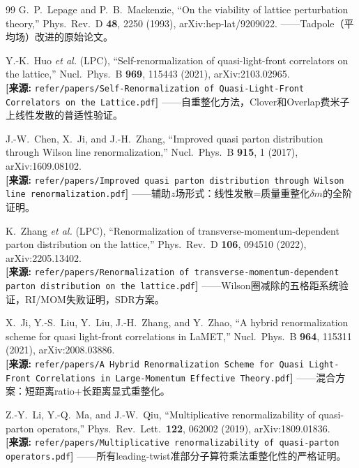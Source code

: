 \documentclass[12pt,a4paper]{ctexart}
\theoremstyle{definition}
\begin{document}
\begin{thebibliography}{99}
G.~P.~Lepage and P.~B.~Mackenzie,
``On the viability of lattice perturbation theory,''
Phys.\ Rev.\ D \textbf{48}, 2250 (1993), arXiv:hep-lat/9209022.
——Tadpole（平均场）改进的原始论文。

Y.-K.~Huo \textit{et al.} (LPC),
``Self-renormalization of quasi-light-front correlators on the lattice,''
Nucl.\ Phys.\ B \textbf{969}, 115443 (2021), arXiv:2103.02965.
\\\textbf{[来源:} \texttt{refer/papers/Self-Renormalization of Quasi-Light-Front Correlators on the Lattice.pdf}\textbf{]}
——自重整化方法，Clover和Overlap费米子上线性发散的普适性验证。

J.-W.~Chen, X.~Ji, and J.-H.~Zhang,
``Improved quasi parton distribution through Wilson line renormalization,''
Nucl.\ Phys.\ B \textbf{915}, 1 (2017), arXiv:1609.08102.
\\\textbf{[来源:} \texttt{refer/papers/Improved quasi parton distribution through Wilson line renormalization.pdf}\textbf{]}
——辅助$z$场形式：线性发散=质量重整化$\delta m$的全阶证明。

K.~Zhang \textit{et al.} (LPC),
``Renormalization of transverse-momentum-dependent parton distribution on the lattice,''
Phys.\ Rev.\ D \textbf{106}, 094510 (2022), arXiv:2205.13402.
\\\textbf{[来源:} \texttt{refer/papers/Renormalization of transverse-momentum-dependent parton distribution on the lattice.pdf}\textbf{]}
——Wilson圈减除的五格距系统验证，RI/MOM失败证明，SDR方案。

X.~Ji, Y.-S.~Liu, Y.~Liu, J.-H.~Zhang, and Y.~Zhao,
``A hybrid renormalization scheme for quasi light-front correlations in LaMET,''
Nucl.\ Phys.\ B \textbf{964}, 115311 (2021), arXiv:2008.03886.
\\\textbf{[来源:} \texttt{refer/papers/A Hybrid Renormalization Scheme for Quasi Light-Front Correlations in Large-Momentum Effective Theory.pdf}\textbf{]}
——混合方案：短距离ratio+长距离显式重整化。

Z.-Y.~Li, Y.-Q.~Ma, and J.-W.~Qiu,
``Multiplicative renormalizability of quasi-parton operators,''
Phys.\ Rev.\ Lett.\ \textbf{122}, 062002 (2019), arXiv:1809.01836.
\\\textbf{[来源:} \texttt{refer/papers/Multiplicative renormalizability of quasi-parton operators.pdf}\textbf{]}
——所有leading-twist准部分子算符乘法重整化性的严格证明。


\end{thebibliography}
\end{document}

